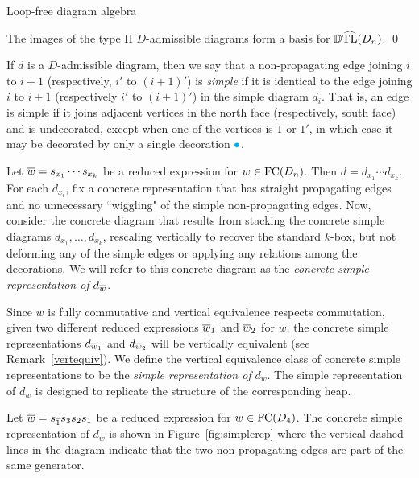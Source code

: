 \begin{section}{Loop-free diagram algebra}
\begin{proposition}
The images of the type II $D$-admissible diagrams form a basis for $\operatorname{\mathbb{D}\widehat{TL}}(D_n)$. %
\qed
\end{proposition}

If $d$ is a $D$-admissible diagram, then we say that a non-propagating edge joining $i$ to $i+1$ (respectively, $i'$ to $(i+1)'$) is \emph{simple} if it is  identical to the edge joining $i$ to $i+1$ (respectively $i'$ to $(i+1)'$) in the simple diagram $d_i$. That is, an edge is simple if it joins adjacent vertices in the north face (respectively, south face) and is undecorated, except when one of the vertices is $1$ or $1'$, in which case it may be decorated by only a single decoration ${\color{cyan}\bullet}$.

Let $\overline{w}=s_{x_1}\cdots s_{x_k}$ be a reduced expression for $w\in\operatorname{FC}(D_n)$. Then $d=d_{x_1}\cdots d_{x_k}$. For each $d_{x_i}$, fix a concrete representation that has straight propagating edges and no unnecessary ``wiggling" of the simple non-propagating edges. Now, consider the concrete diagram that results from stacking the concrete simple diagrams $d_{x_1},\ldots,d_{x_k}$, rescaling vertically to recover the standard $k$-box, but not deforming any of the simple edges or applying any relations among the decorations. We will refer to this concrete diagram as the \emph{concrete simple representation of} $d_{\overline{w}}$. 

Since $w$ is fully commutative and vertical equivalence respects commutation, given two different reduced expressions $\overline{w}_1$ and $\overline{w}_2$ for $w$, the concrete simple representations $d_{\overline{w}_1}$ and $d_{\overline{w}_2}$ will be vertically equivalent (see Remark~\ref{vertequiv}). We define the vertical equivalence class of concrete simple representations to be the \emph{simple representation of }$d_w$. The simple representation of $d_w$ is designed to replicate the structure of the corresponding heap.


\begin{example}\label{simplerep}
Let $\overline{w}=s_{\overline{1}}s_{3}s_{2}s_{1}$ be a reduced expression for $w\in\operatorname{FC}(D_4)$. The concrete simple representation of $d_{w}$ is shown in Figure~\ref{fig:simplerep} where the vertical dashed lines in the diagram indicate that the two non-propagating edges are part of the same generator.
\end{example}


\end{section}
